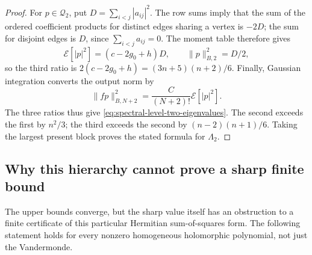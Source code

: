 \documentclass[11pt]{article}
\theoremstyle{remark}
\numberwithin{equation}{section}
\begin{document}
\begin{proof}
For $p\in\mathcal Q_2$, put $D=\sum_{i<j}|a_{ij}|^2$.
The row sums imply that the sum of the ordered coefficient products
for distinct edges sharing a vertex is $-2D$; the sum for disjoint
edges is $D$, since $\sum_{i<j}a_{ij}=0$. The moment table therefore
gives
\[
 \mathcal E[|p|^2]=(c-2g_0+h)D,
 \qquad \|p\|_{B,2}^2=D/2,
\]
so the third ratio is
$2(c-2g_0+h)=(3n+5)(n+2)/6$.
Finally, Gaussian integration converts the output norm by
\[
 \|fp\|_{B,N+2}^2=\frac{C}{(N+2)!}\mathcal E[|p|^2].
\]
The three ratios thus give \eqref{eq:spectral-level-two-eigenvalues}.
The second exceeds the first by $n^2/3$; the third exceeds the
second by $(n-2)(n+1)/6$. Taking the largest present block proves
the stated formula for $\Lambda_2$.
\end{proof}

\subsection{Why this hierarchy cannot prove a sharp finite bound}
The upper bounds converge, but the sharp value itself has an
obstruction to a finite certificate of this particular Hermitian
sum-of-squares form. The following statement holds for every nonzero
homogeneous holomorphic polynomial, not just the Vandermonde.
\end{document}
